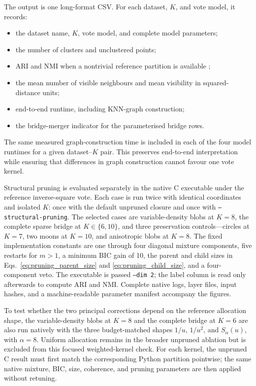 \documentclass[pdflatex,sn-basic,Numbered]{sn-jnl}
\begin{document}
The output is one long-format CSV. For each dataset, $K$, and vote model, it records:
\begin{itemize}
    \item the dataset name, $K$, vote model, and complete model parameters;
    \item the number of clusters and unclustered points;
    \item ARI and NMI when a nontrivial reference partition is available \citep{HubertArabie1985,VinhEppsBailey2010};
    \item the mean number of visible neighbours and mean visibility in squared-distance units;
    \item end-to-end runtime, including KNN-graph construction;
    \item the bridge-merger indicator for the parameterised bridge rows.
\end{itemize}
The same measured graph-construction time is included in each of the four model runtimes for a given dataset--$K$ pair. This preserves end-to-end interpretation while ensuring that differences in graph construction cannot favour one vote kernel.

Structural pruning is evaluated separately in the native C executable under
the reference inverse-square vote.  Each case is run twice with identical
coordinates and isolated $K$: once with the default unpruned closure and once
with \texttt{--structural-pruning}.  The selected cases are variable-density
blobs at $K=8$, the complete sparse bridge at $K\in\{6,10\}$, and three
preservation controls---circles at $K=7$, two moons at $K=10$, and anisotropic
blobs at $K=8$.  The fixed implementation constants are one through four
diagonal mixture components, five restarts for $m>1$, a minimum BIC gain of
10, the parent and child sizes in Eqs.~\eqref{eq:pruning_parent_size} and
\eqref{eq:pruning_child_size}, and a four-component veto.  The executable is
passed \texttt{--dim 2}; the label column is read only afterwards to compute
ARI and NMI.  Complete native logs, layer files, input hashes, and a
machine-readable parameter manifest accompany the figures.

To test whether the two principal corrections depend on the reference allocation shape,
the variable-density blobs at $K=8$ and the complete bridge at $K=6$ are also
run natively with the three budget-matched shapes $1/u$, $1/u^2$, and
$S_\alpha(u)$, with $\alpha=8$.  Uniform allocation remains in the broader
unpruned ablation but is excluded from this focused weighted-kernel check.  For
each kernel, the unpruned C result must first match the corresponding Python
partition pointwise; the same native mixture, BIC, size, coherence, and pruning
parameters are then applied without retuning.
\end{document}

